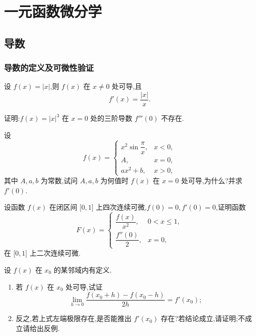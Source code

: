 \documentclass[../../数学分析培优讲义.tex]{subfiles}
\begin{document}
\setcounter{chapter}{3}
\pagestyle{fancy}

\chapter{一元函数微分学}


\section{导数}


\subsection{导数的定义及可微性验证}

\begin{example}
设 $f(x)=|x|$,则 $f(x)$ 在 $x\neq0$ 处可导,且
\[
    f'(x)=\dfrac{|x|}{x}.
\]
\end{example}
\exampleblank

\begin{example}
证明:$f(x)=|x|^3$ 在 $x=0$ 处的三阶导数 $f'''(0)$ 不存在.
\end{example}
\exampleblank

\begin{example}
设
\[
f(x)=
\begin{cases}
    x^2\sin\dfrac{\pi}{x}, & x<0,\\
    A, & x=0,\\
    ax^2+b, & x>0,
\end{cases}
\]
其中 $A,a,b$ 为常数,试问 $A,a,b$ 为何值时 $f(x)$ 在 $x=0$ 处可导,为什么?并求 $f'(0)$.
\end{example}
\exampleblank

\begin{example}
设函数 $f(x)$ 在闭区间 $\lbrack 0,1\rbrack$ 上四次连续可微,$f(0)=0,f'(0)=0$,证明函数
\[
F(x)=
\begin{cases}
    \dfrac{f(x)}{x^2}, & 0<x\leq1,\\
    \dfrac{f''(0)}{2}, & x=0,
\end{cases}
\]
在 $\lbrack 0,1\rbrack$ 上二次连续可微.
\end{example}
\exampleblank

\begin{example}
设 $f(x)$ 在 $x_0$ 的某邻域内有定义.
\begin{enumerate}[label=(\arabic*)]
    \item 若 $f(x)$ 在 $x_0$ 处可导,试证
    \[
        \lim\limits_{h\to0}
        \dfrac{f(x_0+h)-f(x_0-h)}{2h}=f'(x_0);
    \]
    \item 反之,若上式左端极限存在,是否能推出 $f'(x_0)$ 存在?若结论成立,请证明;不成立请给出反例.
\end{enumerate}
\end{example}
\exampleblank
\end{document}
